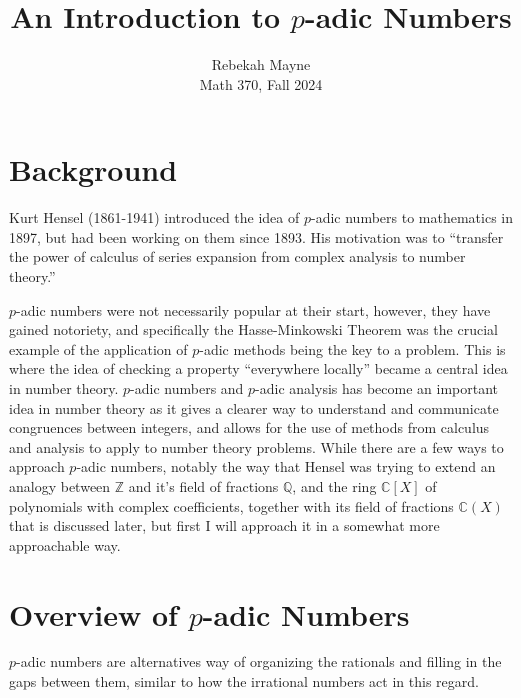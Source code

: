 \documentclass[11pt]{article}
\newcommand{\Z}{\mathbb{Z}}
\newcommand{\C}{\mathbb{C}}
\newcommand{\Q}{\mathbb{Q}}
\newcommand{\padic}{$p$-adic }
\begin{document}
\title{An Introduction to $p$-adic Numbers}
\author{Rebekah Mayne\\
  Math 370, Fall 2024}
\date{}
\maketitle

\section{Background}
Kurt Hensel (1861-1941) introduced the idea of \padic numbers to mathematics in 1897, but had been working on them since 1893. His motivation was to ``transfer the power of calculus of series expansion from complex analysis to number theory.'' \cite{genesis}

\padic numbers were not necessarily popular at their start, however, they have gained notoriety, and specifically the Hasse-Minkowski Theorem was the crucial example of the application of \padic methods being the key to a problem. This is where the idea of checking a property ``everywhere locally'' became a central idea in number theory. \cite{Hist-talk} \padic numbers and \padic analysis has become an important idea in number theory as it gives a clearer way to understand and communicate congruences between integers, and allows for the use of methods from calculus and analysis to apply to number theory problems. While there are a few ways to approach \padic numbers, notably the way that Hensel was trying to extend an analogy between $\Z$ and it's field of fractions $\Q$, and the ring $\C[X]$ of polynomials with complex coefficients, together with its field of fractions $\C(X)$ that is discussed later, but first I will approach it in a somewhat more approachable way.



\section{Overview of \padic Numbers}
\padic numbers are alternatives way of organizing the rationals and filling in the gaps between them, similar to how the irrational numbers act in this regard.
\end{document}
